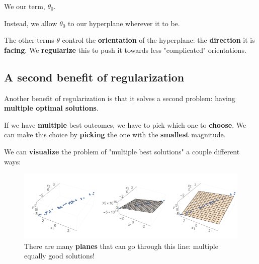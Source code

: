         \begin{concept}
            We  our  term, $\theta_0$. 
            
            Instead, we allow $\theta_0$ to  our hyperplane wherever it  to be.
        \end{concept}
        
        The other terms $\theta$ control the \textbf{orientation} of the hyperplane: the \textbf{direction} it is \textbf{facing}. We \textbf{regularize} this to push it towards less "complicated" orientations.

        
    \subsection*{A second benefit of regularization}
    
        Another benefit of regularization is that it solves a second problem: having \textbf{multiple optimal solutions}.
        
        If we have \textbf{multiple} best outcomes, we have to pick which one to \textbf{choose}. We can make this choice by \textbf{picking} the one with the \textbf{smallest} magnitude.
        
        We can \textbf{visualize} the problem of "multiple best solutions" a couple different ways:
        
        \begin{figure}[H]
        \centering
            \includegraphics[width=120mm,scale=0.5]{images/regression_images/Regularizer_Multiple_Solutions.png}
        
            \caption*{There are many \textbf{planes} that can go through this line: multiple equally good solutions!}
        \end{figure}
        

